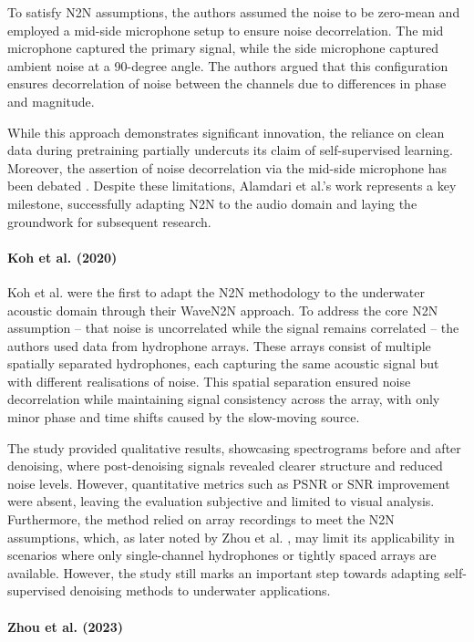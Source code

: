 To satisfy N2N assumptions, the authors assumed the noise to be zero-mean and employed a mid-side microphone setup to ensure noise decorrelation. The mid microphone captured the primary signal, while the side microphone captured ambient noise at a 90-degree angle. The authors argued that this configuration ensures decorrelation of noise between the channels due to differences in phase and magnitude.

While this approach demonstrates significant innovation, the reliance on clean data during pretraining partially undercuts its claim of self-supervised learning. Moreover, the assertion of noise decorrelation via the mid-side microphone has been debated \cite{koh_underwater_2020}. Despite these limitations, Alamdari et al.'s work represents a key milestone, successfully adapting N2N to the audio domain and laying the groundwork for subsequent research.

\paragraph{Koh et al. (2020)}

Koh et al. \cite{koh_underwater_2020} were the first to adapt the N2N methodology to the underwater acoustic domain through their WaveN2N approach.  To address the core N2N assumption -- that noise is uncorrelated while the signal remains correlated -- the authors used data from hydrophone arrays. These arrays consist of multiple spatially separated hydrophones, each capturing the same acoustic signal but with different realisations of noise. This spatial separation ensured noise decorrelation while maintaining signal consistency across the array, with only minor phase and time shifts caused by the slow-moving source.

The study provided qualitative results, showcasing spectrograms before and after denoising, where post-denoising signals revealed clearer structure and reduced noise levels. However, quantitative metrics such as PSNR or SNR improvement were absent, leaving the evaluation subjective and limited to visual analysis. Furthermore, the method relied on array recordings to meet the N2N assumptions, which, as later noted by Zhou et al. \cite{zhou_self-noise_2023}, may limit its applicability in scenarios where only single-channel hydrophones or tightly spaced arrays are available. However, the study still marks an important step towards adapting self-supervised denoising methods to underwater applications.

\paragraph{Zhou et al. (2023)}

